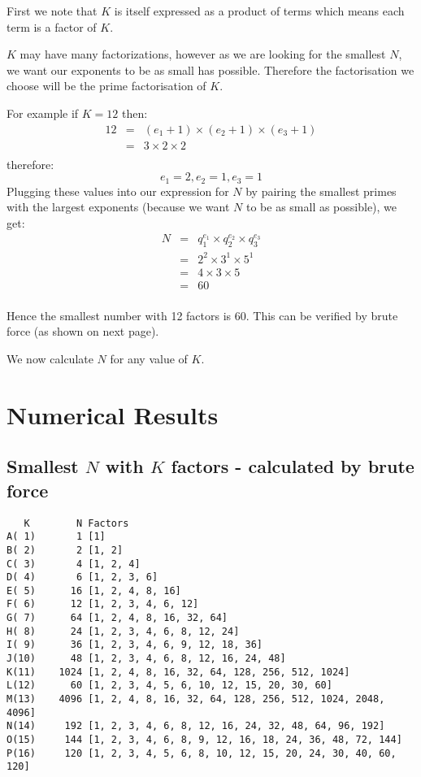 \documentclass{article}
\begin{document}
First we note that $K$ is itself expressed as a product of terms which means each term is a factor of $K$. 

$K$ may have many factorizations, however as we are looking for the smallest $N$, we want our exponents to be as small has possible. 
Therefore the factorisation we choose will be the prime factorisation of $K$.

For example if $K = 12$ then:
\begin{eqnarray*}
12 
& = & ( e_1 + 1) \times ( e_2 + 1 ) \times (e_3 + 1) \\
& = & 3 \times 2 \times 2 \\
\end{eqnarray*}
therefore:
$$
e_1 = 2, e_2 = 1, e_3 = 1
$$
Plugging these values into our expression for $N$ by pairing the smallest primes with the largest exponents (because we want $N$ to be as small as possible), we get:
\begin{eqnarray*}
N
& = & q_1 ^ {e_1} \times q_2 ^ {e_2} \times q_3 ^ {e_3} \\
& = & 2^2 \times 3^1 \times 5^1 \\
& = & 4 \times 3 \times 5 \\
& = & 60 \\
\end{eqnarray*}

Hence the smallest number with 12 factors is 60. 
This can be verified by brute force (as shown on next page).

We now calculate $N$ for any value of $K$.

\pagebreak
\section*{Numerical Results}
\subsection*{Smallest $N$ with $K$ factors - calculated by brute force}
\begin{verbatim}
   K        N Factors
A( 1)       1 [1]
B( 2)       2 [1, 2]
C( 3)       4 [1, 2, 4]
D( 4)       6 [1, 2, 3, 6]
E( 5)      16 [1, 2, 4, 8, 16]
F( 6)      12 [1, 2, 3, 4, 6, 12]
G( 7)      64 [1, 2, 4, 8, 16, 32, 64]
H( 8)      24 [1, 2, 3, 4, 6, 8, 12, 24]
I( 9)      36 [1, 2, 3, 4, 6, 9, 12, 18, 36]
J(10)      48 [1, 2, 3, 4, 6, 8, 12, 16, 24, 48]
K(11)    1024 [1, 2, 4, 8, 16, 32, 64, 128, 256, 512, 1024]
L(12)      60 [1, 2, 3, 4, 5, 6, 10, 12, 15, 20, 30, 60]
M(13)    4096 [1, 2, 4, 8, 16, 32, 64, 128, 256, 512, 1024, 2048, 4096]
N(14)     192 [1, 2, 3, 4, 6, 8, 12, 16, 24, 32, 48, 64, 96, 192]
O(15)     144 [1, 2, 3, 4, 6, 8, 9, 12, 16, 18, 24, 36, 48, 72, 144]
P(16)     120 [1, 2, 3, 4, 5, 6, 8, 10, 12, 15, 20, 24, 30, 40, 60, 120]
\end{verbatim}
\end{document}
